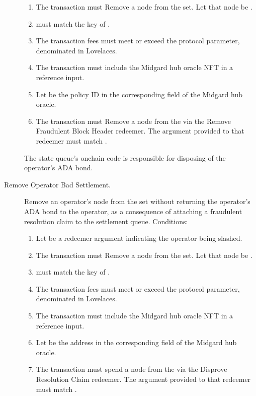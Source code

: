 \documentclass[../midgard.tex]{subfiles}
\begin{document}
\begin{description}
\begin{enumerate}
            \item The transaction must Remove a node from the  set.
              Let that node be .
            \item {} must match the key of .
            \item The transaction fees must meet or exceed the  protocol parameter, denominated in Lovelaces.
            \item The transaction must include the Midgard hub oracle NFT in a reference input.
            \item Let  be the policy ID in the corresponding field of the Midgard hub oracle.
            \item The transaction must Remove a node from the  via the Remove Fraudulent Block Header redeemer.
              The  argument provided to that redeemer must match .
        \end{enumerate}

        The state queue's onchain code is responsible for disposing of the operator's ADA bond.
    \item[Remove Operator Bad Settlement.] Remove an operator's node from the  set without returning the operator's ADA bond to the operator, as a consequence of attaching a fraudulent resolution claim to the settlement queue.
      Conditions:
        \begin{enumerate}
            \item Let  be a redeemer argument indicating the operator being slashed.
            \item The transaction must Remove a node from the  set.
              Let that node be .
            \item {} must match the key of .
            \item The transaction fees must meet or exceed the  protocol parameter, denominated in Lovelaces.
            \item The transaction must include the Midgard hub oracle NFT in a reference input.
            \item Let  be the address in the corresponding field of the Midgard hub oracle.
            \item The transaction must spend a node from the  via the Disprove Resolution Claim redeemer.
              The  argument provided to that redeemer must match .
        \end{enumerate}


\end{description}
\end{document}
